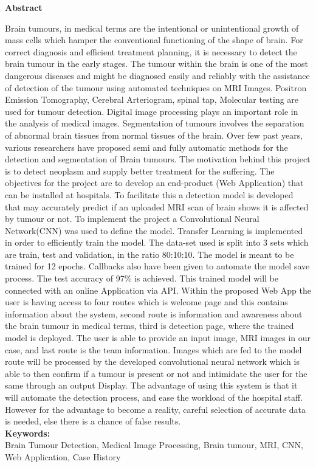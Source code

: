 \begin{center}
{\huge \bf Abstract}
\end{center}
\vspace{20mm}

Brain tumours, in medical terms are the intentional or unintentional growth of mass cells which hamper the conventional functioning of the shape of brain. For correct diagnosis and efficient treatment planning, it is necessary to detect the brain tumour in the early stages. The tumour within the brain is one of the most dangerous diseases and might be diagnosed easily and reliably with the assistance of detection of the tumour using automated techniques on MRI Images. Positron Emission Tomography, Cerebral Arteriogram, spinal tap, Molecular testing are used for tumour detection. Digital image processing plays an important role in the analysis of medical images. Segmentation of tumours involves the separation of abnormal brain tissues from normal tissues of the brain. Over few past years, various researchers have proposed semi and fully automatic methods for the detection and segmentation of Brain tumours. The motivation behind this project is to detect neoplasm and supply better treatment for the suffering. The objectives for the project are to develop an end-product (Web Application) that can be installed at hospitals. To facilitate this a detection model is developed that may accurately predict if an uploaded MRI scan of brain shows it is affected by tumour or not. To implement the project a Convolutional Neural Network(CNN) was used to define the model. Transfer Learning is implemented in order to efficiently train the model. The data-set used is split into 3 sets which are train, test and validation, in the ratio 80:10:10. The model is meant to be trained for 12 epochs. Callbacks also have been given to automate the model save process. The test accuracy of 97\% is achieved. This trained model will be connected with an online Application via API. Within the proposed Web App the user is having access to four routes which is welcome page and this contains information about the system, second route is information and awareness about the brain tumour in medical terms, third is detection page, where the trained model is deployed. The user is able to provide an input image, MRI images in our case, and last route is the team information. Images which are fed to the model route will be processed by the developed convolutional neural network which is able to then confirm if a tumour is present or not and intimidate the user for the same through an output Display. The advantage of using this system is that it will automate the detection process, and ease the workload of the hospital staff. However for the advantage to become a reality, careful selection of accurate data is needed, else there is a chance of false results.\\ 

{\bf{Keywords:}}\\ Brain Tumour Detection, Medical Image Processing, Brain tumour, MRI, CNN, Web Application, Case History 